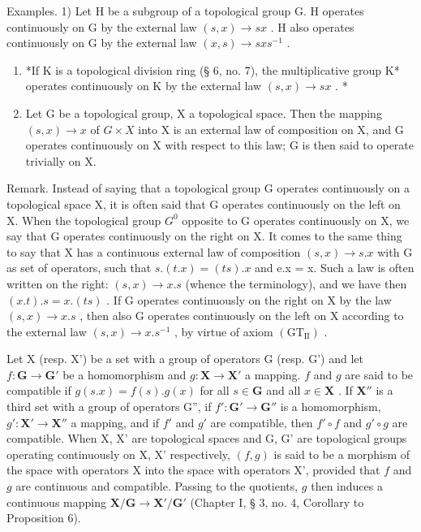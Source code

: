 Examples. 1) Let H be a subgroup of a topological group G. H operates continuously on G by the external law \((s, x) \rightarrow sx\) . H also operates continuously on G by the external law \((x, s) \rightarrow sxs^{-1}\) .

\begin{enumerate}
\def\labelenumi{\arabic{enumi})}
\setcounter{enumi}{1}
\item
  *If K is a topological division ring (§ 6, no. 7), the multiplicative group K* operates continuously on K by the external law \((s, x) \to sx\) . *
\item
  Let G be a topological group, X a topological space. Then the mapping \((s, x) \to x\) of \(G \times X\) into X is an external law of composition on X, and G operates continuously on X with respect to this law; G is then said to operate trivially on X.
\end{enumerate}

Remark. Instead of saying that a topological group G operates continuously on a topological space X, it is often said that G operates continuously on the left on X. When the topological group \(G^{0}\) opposite to G operates continuously on X, we say that G operates continuously on the right on X. It comes to the same thing to say that X has a continuous external law of composition \((s, x) \to s.x\) with G as set of operators, such that \(s.(t.x) = (ts).x\) and e.x = x. Such a law is often written on the right: \((s, x) \to x.s\) (whence the terminology), and we have then \((x.t).s = x.(ts)\) . If G operates continuously on the right on X by the law \((s, x) \to x.s\) , then also G operates continuously on the left on X according to the external law \((s, x) \to x.s^{-1}\) , by virtue of axiom \((\mathrm{GT}_{\mathrm{II}})\) .

Let X (resp. X') be a set with a group of operators G (resp. G') and let \(f: \mathbf{G} \to \mathbf{G}'\) be a homomorphism and \(g: \mathbf{X} \to \mathbf{X}'\) a mapping. \(f\) and \(g\) are said to be compatible if \(g(s.x) = f(s).g(x)\) for all \(s \in \mathbf{G}\) and all \(x \in \mathbf{X}\) . If \(\mathbf{X}''\) is a third set with a group of operators G'', if \(f': \mathbf{G}' \to \mathbf{G}''\) is a homomorphism, \(g': \mathbf{X}' \to \mathbf{X}''\) a mapping, and if \(f'\) and \(g'\) are compatible, then \(f' \circ f\) and \(g' \circ g\) are compatible. When X, X' are topological spaces and G, G' are topological groups operating continuously on X, X' respectively, \((f, g)\) is said to be a morphism of the space with operators X into the space with operators X', provided that \(f\) and \(g\) are continuous and compatible. Passing to the quotients, \(g\) then induces a continuous mapping \(\mathbf{X}/\mathbf{G} \to \mathbf{X}'/\mathbf{G}'\) (Chapter I, § 3, no. 4, Corollary to Proposition 6).

